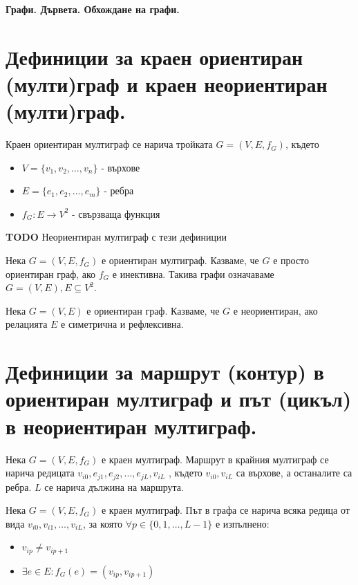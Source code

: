 \documentclass[fleqn,12pt]{article}
\begin{document}

\Large\center\textbf{Графи. Дървета. Обхождане на графи.}



\begin{flushleft}

\section{Дефиниции за краен ориентиран (мулти)граф и краен неориентиран (мулти)граф.}
Краен ориентиран мултиграф се нарича тройката $G = (V, E, f_G)$, където
\begin{itemize}
	\item $V = \{ v_1, v_2, \dots, v_n \}$ - върхове
	\item $E = \{ e_1, e_2, \dots, e_m \}$ - ребра
	\item $f_G : E \rightarrow V^2$ - свързваща функция
\end{itemize}
\vspace{10mm}

\textbf{TODO} Неориентиран мултиграф с тези дефиниции
\vspace{10mm}

Нека $G = (V, E, f_G)$ е ориентиран мултиграф. Казваме, че $G$ е просто ориентиран граф, ако $f_G$ е инективна. 
Такива графи означаваме $G = (V, E), E \subseteq V^2$.
\vspace{10mm}

Нека $G = (V, E)$ е ориентиран граф. Казваме, че $G$ е неориентиран, ако релацията $E$ е симетрична и рефлексивна.

\section{Дефиниции за маршрут (контур) в ориентиран мултиграф и път (цикъл) в неориентиран мултиграф.}

Нека $G = (V, E, f_G)$ е краен мултиграф. Маршрут в крайния мултиграф се нарича
редицата $v_{i0} , e_{j1} , e_{j2} , \dots , e_{jL} , v_{iL}$ , където $v_{i0}, v_{iL}$ са върхове, а останалите са ребра. 
$L$ се нарича дължина на маршрута.
\vspace{10mm}

Нека $G = (V, E, f_G)$ е краен мултиграф. Път в графа се нарича всяка редица от вида
$v_{i0}, v_{i1}, \dots, v_{iL}$, за която $\forall p \in \{ 0, 1, \dots, L - 1 \}$ е изпълнено:
\begin{itemize}
	\item $v_{ip} \neq v_{ip+1}$
	\item $\exists e \in E : f_G(e) = (v_{ip}, v_{ip+1})$
\end{itemize}
\vspace{10mm}


\end{flushleft}
\end{document}
